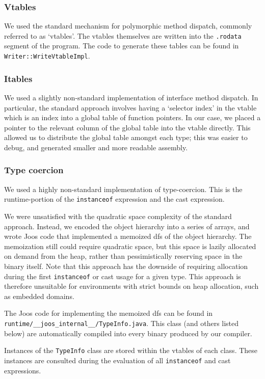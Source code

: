 \documentclass[12pt, titlepage]{article}
\newcommand{\z}[1]{\texttt{#1}}
\begin{document}
\subsubsection{Vtables}\label{subsubsec:vtables}
We used the standard mechanism for polymorphic method dispatch, commonly
referred to as `vtables'. The vtables themselves are written into the
\z{.rodata} segment of the program. The code to generate these tables can be
found in \z{Writer::WriteVtableImpl}.

\subsubsection{Itables}\label{subsubsec:itables}
We used a slightly non-standard implementation of interface method dispatch. In
particular, the standard approach involves having a `selector index' in the
vtable which is an index into a global table of function pointers. In our case,
we placed a pointer to the relevant column of the global table into the vtable
directly. This allowed us to distribute the global table amongst each type;
this was easier to debug, and generated smaller and more readable assembly.

\subsubsection{Type coercion}\label{subsubsec:co}
We used a highly non-standard implementation of type-coercion. This is the
runtime-portion of the \z{instanceof} expression and the cast expression.

We were unsatisfied with the quadratic space complexity of the standard
approach. Instead, we encoded the object hierarchy into a series of arrays, and
wrote Joos code that implemented a memoized \ac{dfs} of the object hierarchy.
The memoization still could require quadratic space, but this space is lazily
allocated on demand from the heap, rather than pessimistically reserving space
in the binary itself. Note that this approach has the downside of requiring
allocation during the first \z{instanceof} or cast usage for a given type. This
approach is therefore unsuitable for environments with strict bounds on heap
allocation, such as embedded domains.

The Joos code for implementing the memoized \ac{dfs} can be found in
\z{runtime/\_\_joos\_internal\_\_/TypeInfo.java}. This class (and others listed
below) are automatically compiled into every binary produced by our compiler.

Instances of the \z{TypeInfo} class are stored within the vtables of each
class. These instances are consulted during the evaluation of all
\z{instanceof} and cast expressions.
\end{document}
